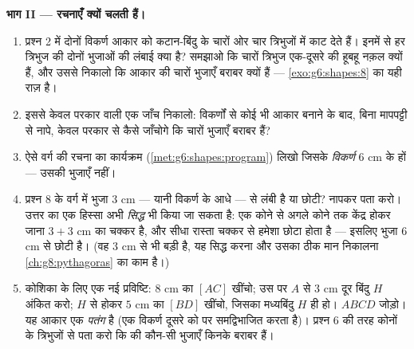 \begin{problem}
\medskip
\noindent\textbf{भाग II --- रचनाएँ क्यों चलती हैं।}
\begin{enumerate}[resume]
  \item प्रश्न 2 में दोनों विकर्ण आकार को कटान-बिंदु के चारों ओर
        चार  त्रिभुजों में काट देते हैं। इनमें से हर
        त्रिभुज की दोनों भुजाओं की लंबाई क्या है? समझाओ कि चारों
        त्रिभुज एक-दूसरे की हूबहू नक़ल क्यों हैं, और उससे निकालो
        कि आकार की चारों भुजाएँ बराबर क्यों हैं ---
        \cref{exo:g6:shapes:8} का यही राज़ है।
  \item इससे केवल परकार वाली एक जाँच निकालो: विकर्णों से कोई भी
        आकार बनाने के बाद, बिना मापपट्टी से नापे, केवल परकार से
        कैसे जाँचोगे कि चारों भुजाएँ बराबर हैं?
  \item ऐसे वर्ग की रचना का कार्यक्रम
        (\cref{met:g6:shapes:program}) लिखो जिसके \emph{विकर्ण}
        $6$ cm के हों --- उसकी भुजाएँ नहीं।
  \item प्रश्न 8 के वर्ग में भुजा $3$ cm --- यानी विकर्ण के आधे
        --- से लंबी है या छोटी? नापकर पता करो। उत्तर का एक हिस्सा
        अभी \emph{सिद्ध} भी किया जा सकता है: एक कोने से अगले
        कोने तक केंद्र होकर जाना $3 + 3$ cm का चक्कर है, और सीधा
        रास्ता चक्कर से हमेशा छोटा होता है --- इसलिए भुजा $6$ cm
        से छोटी है। (वह $3$ cm से भी बड़ी है, यह सिद्ध करना और
        उसका ठीक मान निकालना \cref{ch:g8:pythagoras} का काम है।)
  \item कोशिका के लिए एक नई प्रविष्टि: $8$ cm का  $[AC]$
        खींचो; उस पर $A$ से $3$ cm दूर बिंदु $H$ अंकित करो; $H$
        से होकर $5$ cm का   $[BD]$ खींचो, जिसका
        मध्यबिंदु $H$ ही हो। $ABCD$ जोड़ो। यह आकार एक
        \emph{पतंग} है (एक विकर्ण दूसरे को  पर
        समद्विभाजित करता है)। प्रश्न 6 की तरह कोनों के त्रिभुजों
        से पता करो कि  की कौन-सी भुजाएँ किनके बराबर हैं।
\end{enumerate}


\end{problem}
